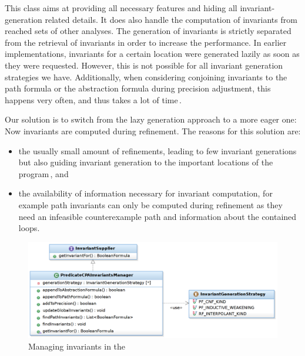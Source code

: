 This class aims at providing all necessary features and hiding all invariant-generation related details. It does also handle
the computation of invariants from reached sets of other analyses. The generation of invariants is strictly separated from the retrieval of invariants in order to increase the performance. In 
earlier implementations, invariants for a certain location were generated lazily as soon as they were requested. However, this is not possible for all invariant generation strategies we have. 
Additionally, when considering conjoining invariants to the path formula or the abstraction formula during precision adjustment, this happens very often, and thus takes a lot of time\,.

Our solution is to switch from the lazy generation approach to a more eager one: Now invariants are computed during refinement. The reasons for this solution are:
\begin{itemize}
 \item the usually small amount of refinements, leading to few invariant generations but also guiding invariant generation to the important locations of the program\,, and
 \item the availability of information necessary for invariant computation, for example path invariants can only be computed during refinement as they need an infeasible counterexample path and information about the contained loops.
\end{itemize}

\begin{figure}
 \centering
 \includegraphics[width=\textwidth]{../graphics/inv_manager_arch.png}
 \caption{Managing invariants in the \PredicateCPA{}}
 \label{fig:inv_manager}
\end{figure}

